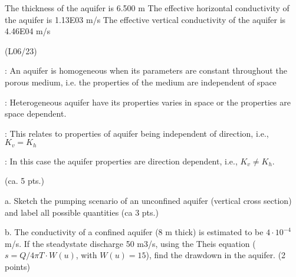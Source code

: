 \documentclass[letterpaper,10pt,english]{sphinxmanual}
\begin{document}
\begin{sphinxVerbatim}[commandchars=\\\{\}]
 
 
 
\end{sphinxVerbatim}

\begin{sphinxVerbatim}[commandchars=\\\{\}]
The thickness of the aquifer is 6.500 m
The effective horizontal conductivity of the aquifer is 1.13E\PYGZhy{}03 m/s
The effective vertical conductivity of the aquifer is 4.46E\PYGZhy{}04 m/s
\end{sphinxVerbatim}

 (L06/23)

: An aquifer is homogeneous when its parameters are constant throughout the porous medium, i.e. the properties of the medium are independent of space

: Heterogeneous aquifer have its properties varies in space or the properties are space dependent.

: This relates to properties of aquifer being independent of direction, i.e., \(K_v = K_h\)

: In this case the aquifer properties are direction dependent, i.e., \(K_v \neq K_h\).

 (ca. 5 pts.)

a. Sketch the pumping scenario of an unconfined aquifer (vertical cross section) and label all possible quantities (ca 3 pts.)

b. The conductivity of a confined aquifer (8 m thick) is estimated to be \(4\cdot 10^{-4}\) m/s. If the steady\sphinxhyphen{}state discharge 50 m3/s, using the Theis equation (\(s = Q/4\pi T·W(u)\), with \(W(u) = 15\)), find the drawdown in the aquifer. (2 points)
\end{document}
